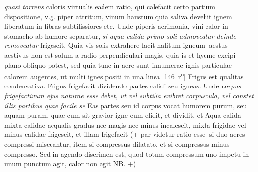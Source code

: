 \textit{quasi torrens } caloris virtualis eadem ratio, qui calefacit certo partium dispositione, v.g. piper attritum, vinum haustum quia saliva\protect{} devehit ignem liberatum in fibras subtilissiores etc. Unde piperis acrimonia, vini calor in stomacho ab humore separatur, \textit{si aqua calida primo soli admoveatur deinde removeatur } frigescit. Quia vis solis\protect{} extrahere facit halitum igneum\protect{}: aestus aestivus non est solum a radio perpendiculari magis, quia is et hyeme excipi plano obliquo potest, sed quia tunc in aere sunt innumerae ignis particulae\protect{} calorem augentes, ut multi ignes positi in una linea 
[146~r\textsuperscript{o}]
\pend%
\pstart%
%
%
%
% 
 Frigus\protect{} est qualitas condensativa.  Frigus frigefacit dividendo partes calidi\protect{} seu igneas\protect{}. Unde \textit{corpus frigefactivum ejus naturae esse debet, ut vel subtilia evibret corpuscula, vel constet illis partibus quae facile se } Eas partes seu id corpus vocat humorem purum\protect{}, seu aquam puram, quae cum sit gravior igne eum elidit, et dividit, et 
Aqua calida mixta calidae aequalis gradus nec magis nec minus incalescit, mixta frigidae vel minus calidae frigescit, et illam frigefacit (+ par videtur ratio esse, si duo aeres compressi misceantur, item si compressus dilatato, et si compressus minus compresso. Sed in agendo discrimen est, quod totum compressum uno impetu in unum punctum agit, calor non agit NB. +) 
